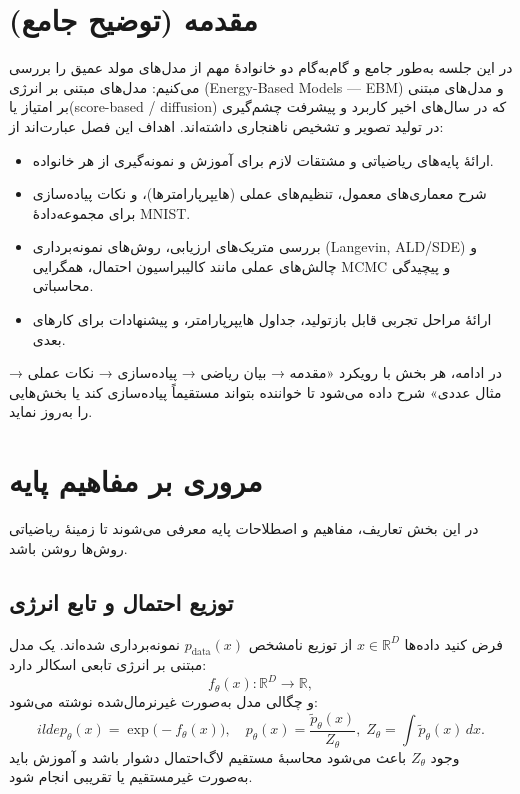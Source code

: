 \section{مقدمه (توضیح جامع)}
در این جلسه به‌طور جامع و گام‌به‌گام دو خانوادهٔ مهم از مدل‌های مولد عمیق را بررسی می‌کنیم: مدل‌های مبتنی بر انرژی (Energy-Based Models — EBM) و مدل‌های مبتنی بر امتیاز یا(score-based / diffusion) که در سال‌های اخیر کاربرد و پیشرفت چشم‌گیری در تولید تصویر و تشخیص ناهنجاری داشته‌اند. اهداف این فصل عبارت‌اند از:
\begin{itemize}
    \item ارائهٔ پایه‌های ریاضیاتی و مشتقات لازم برای آموزش و نمونه‌گیری از هر خانواده.
    \item شرح معماری‌های معمول، تنظیم‌های عملی (هایپرپارامترها)، و نکات پیاده‌سازی برای مجموعه‌دادهٔ MNIST.
    \item بررسی متریک‌های ارزیابی، روش‌های نمونه‌برداری (Langevin, ALD/SDE) و چالش‌های عملی مانند کالیبراسیون احتمال، همگرایی MCMC و پیچیدگی محاسباتی.
    \item ارائهٔ مراحل تجربی قابل بازتولید، جداول هایپرپارامتر، و پیشنهادات برای کارهای بعدی.
\end{itemize}

در ادامه، هر بخش با رویکرد «مقدمه → بیان ریاضی → پیاده‌سازی → نکات عملی → مثال‌ عددی» شرح داده می‌شود تا خواننده بتواند مستقیماً پیاده‌سازی کند یا بخش‌هایی را به‌روز نماید.


\section{مروری بر مفاهیم پایه}
در این بخش تعاریف، مفاهیم و اصطلاحات پایه معرفی می‌شوند تا زمینهٔ ریاضیاتی روش‌ها روشن باشد.

\subsection{توزیع احتمال و تابع انرژی}
فرض کنید داده‌ها \(x \in \mathbb{R}^D\) از توزیع نامشخص \(p_{\text{data}}(x)\) نمونه‌برداری شده‌اند. یک مدل مبتنی بر انرژی تابعی اسکالر دارد:
\begin{equation}
f_{\theta}(x): \mathbb{R}^D \to \mathbb{R},
\end{equation}
و چگالی مدل به‌صورت غیرنرمال‌شده نوشته می‌شود:
\begin{equation}
	ilde p_{\theta}(x) = \exp\big(-f_{\theta}(x)\big),\quad p_{\theta}(x)=\frac{\tilde p_{\theta}(x)}{Z_{\theta}},\; Z_{\theta}=\int \tilde p_{\theta}(x)\,dx.
\end{equation}
وجود \(Z_{\theta}\) باعث می‌شود محاسبهٔ مستقیم لاگ‌احتمال دشوار باشد و آموزش باید به‌صورت غیرمستقیم یا تقریبی انجام شود.

